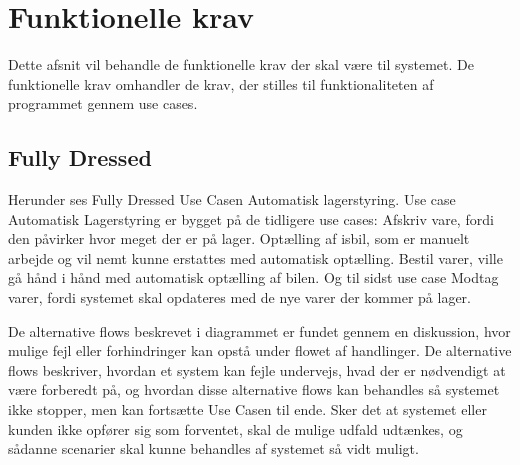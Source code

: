 \section{Funktionelle krav}\label{sec:funktionelle-krav}
Dette afsnit vil behandle de funktionelle krav der skal være til systemet. De funktionelle krav omhandler de krav, der stilles til funktionaliteten af programmet gennem use cases\cite{Larman2004}. 

\subsection{Fully Dressed} \label{fullydressed}
Herunder ses Fully Dressed Use Casen Automatisk lagerstyring. Use case Automatisk Lagerstyring er bygget på de tidligere use cases: Afskriv vare, fordi den påvirker hvor meget der er på lager. Optælling af isbil, som er manuelt arbejde og vil nemt kunne erstattes med automatisk optælling. Bestil varer, ville gå hånd i hånd med automatisk optælling af bilen. Og til sidst use case Modtag varer, fordi systemet skal opdateres med de nye varer der kommer på lager. 

De alternative flows beskrevet i diagrammet er fundet gennem en diskussion, hvor mulige fejl eller forhindringer kan opstå under flowet af handlinger. De alternative flows beskriver, hvordan et system kan fejle undervejs, hvad der er nødvendigt at være forberedt på, og hvordan disse alternative flows kan behandles så systemet ikke stopper, men kan fortsætte Use Casen til ende. Sker det at systemet eller kunden ikke opfører sig som forventet, skal de mulige udfald udtænkes, og sådanne scenarier skal kunne behandles af systemet så vidt muligt.

